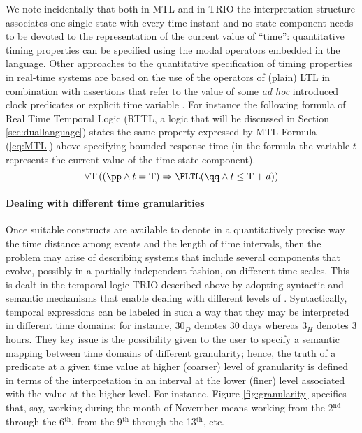 We note incidentally that both in MTL and in TRIO the interpretation 
structure associates one single state with every time instant 
and no  state component needs to be devoted to the representation 
of the current value of ``time'': quantitative timing properties 
can be specified using the modal operators embedded in the language. 
Other approaches to the quantitative specification of timing 
properties in real-time systems are based on the use of the operators 
of (plain) LTL in combination with assertions that refer to the 
value of some \emph{ad hoc} introduced clock predicates or explicit 
time variable \cite{Ost89}. For instance the following formula of 
Real Time Temporal Logic (RTTL, a logic that will be discussed 
in Section \ref{sec:duallanguage}) states the same property expressed by 
MTL Formula (\ref{eq:MTL}) above specifying bounded response time (in 
the formula the variable $t$ represents the current value of 
the time state component). 
\begin{equation*}
  \forall \mathrm{T} \left( ( \pp \wedge t = \mathrm{T}) \Rightarrow \FLTL ( \qq \wedge t \leq \mathrm{T} + d ) \right)
\end{equation*}



\paragraph{Dealing with different time granularities}
Once suitable constructs are available to denote in a quantitatively
precise way the time distance among events and the length of time
intervals, then the problem may arise of describing systems that
include several components that evolve, possibly in a partially
independent fashion, on different time scales. This is dealt in the
temporal logic TRIO described above by adopting syntactic and semantic
mechanisms that enable dealing with different levels of  \cite{CCM+91}.
 Syntactically, temporal expressions can be
labeled in such a way that they may be interpreted in different time
domains: for instance, $30_D$ denotes 30 days whereas $3_H$ denotes 3
hours. They key issue is the possibility given to the user to specify
a semantic mapping between time domains of different granularity;
hence, the truth of a predicate at a given time value at higher
(coarser) level of granularity is defined in terms of the
interpretation in an interval at the lower (finer) level associated
with the value at the higher level. For instance, Figure
\ref{fig:granularity} specifies that, say, working during the month of
November means working from the 2$^\text{nd}$ through the 6$^\text{th}$, from the 9$^\text{th}$
through the 13$^\text{th}$, etc.

